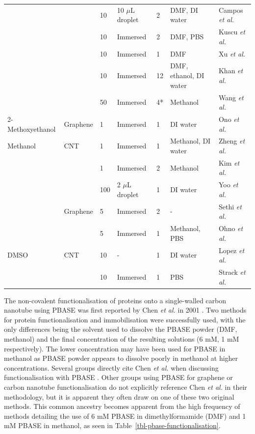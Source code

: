 \documentclass[
  a4paper,
]{scrbook}
\begin{document}
\begin{longtable}[]{@{}lllllll@{}}
& & 10 & 10 \(\mu\)L droplet & 2 & DMF, DI water & Campos
\textit{et al.} \cite{Campos2019} \\
& & 10 & Immersed & 2 & DMF, PBS & Kuscu \textit{et al.}
\cite{Kuscu2020} \\
& & 10 & Immersed & 1 & DMF & Xu \textit{et al.} \cite{Xu2017} \\
& & 10 & Immersed & 12 & DMF, ethanol, DI water & Khan \textit{et al.}
\cite{Khan2020} \\
& & 50 & Immersed & 4* & Methanol & Wang \textit{et al.}
\cite{Wang2020} \\
2-Methoxyethanol & Graphene & 1 & Immersed & 1 & DI water & Ono
\textit{et al.} \cite{Ono2020} \\
Methanol & CNT & 1 & Immersed & 1 & Methanol, DI water & Zheng
\textit{et al.} \cite{Zheng2016} \\
& & 1 & Immersed & 2 & Methanol & Kim \textit{et al.} \cite{Kim2009} \\
& & 100 & 2 \(\mu\)L droplet & 1 & DI water & Yoo \textit{et al.}
\cite{Yoo2022} \\
& Graphene & 5 & Immersed & 2 & - & Sethi \textit{et al.}
\cite{Sethi2020} \\
& & 5 & Immersed & 1 & Methanol, PBS & Ohno \textit{et al.}
\cite{Ohno2010} \\
DMSO & CNT & 10 & - & 1 & DI water & Lopez \textit{et al.}
\cite{Lopez2015} \\
& & 10 & Immersed & 1 & PBS & Strack \textit{et al.}
\cite{Strack2013} \\
\end{longtable}

\newpage
{}

The non-covalent functionalisation of proteins onto a single-walled
carbon nanotube using PBASE was first reported by Chen \emph{et al.} in
2001 \autocite{Chen2001}. Two methods for protein functionalisation and
immobilisation were successfully used, with the only differences being
the solvent used to dissolve the PBASE powder (DMF, methanol) and the
final concentration of the resulting solutions (6 mM, 1 mM
respectively). The lower concentration may have been used for PBASE in
methanol as PBASE powder appears to dissolve poorly in methanol at
higher concentrations. Several groups directly cite Chen \emph{et al.}
when discussing functionalisation with PBASE
\autocite{Besteman2003,Cella2010,Campos2019,Zheng2016,Ohno2010}. Other
groups using PBASE for graphene or carbon nanotube functionalisation do
not explicitly reference Chen \emph{et al.} in their methodology, but it
is apparent they often draw on one of these two original methods. This
common ancestry becomes apparent from the high frequency of methods
detailing the use of 6 mM PBASE in dimethylformamide (DMF) and 1 mM
PBASE in methanol, as seen in Table~\ref{tbl-pbase-functionalisation}.
\end{document}
